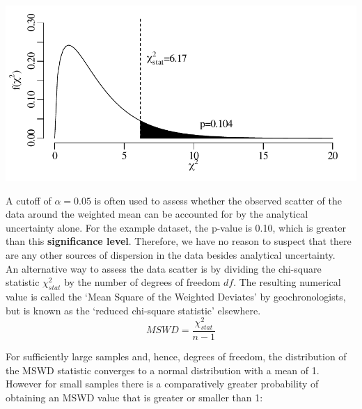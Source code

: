 \begin{refsection}
\noindent\begin{minipage}[t]{.7\textwidth}
\strut\vspace*{-\baselineskip}\newline
\includegraphics[width=\textwidth]{../figures/chi2wtdmean.pdf}
\end{minipage}
\begin{minipage}[t]{.3\textwidth}
  \label{fig:chi2}
\end{minipage}

A cutoff of $\alpha=0.05$ is often used to assess whether the observed
scatter of the data around the weighted mean can be accounted for by
the analytical uncertainty alone.  For the example dataset, the
p-value is 0.10, which is greater than this \textbf{significance
  level}. Therefore, we have no reason to suspect that there are any
other sources of dispersion in the data besides analytical
uncertainty.\\

An alternative way to assess the data scatter is by dividing the
chi-square statistic $\chi^2_{stat}$ by the number of degrees of
freedom $df$.  The resulting numerical value is called the `Mean
Square of the Weighted Deviates' \citep[MSWD,][]{mcintyre1966} by
geochronologists, but is known as the `reduced chi-square statistic'
elsewhere.
\begin{equation}
  MSWD = \frac{\chi^2_{stat}}{n-1}
  \label{eq:mswd}
\end{equation}

For sufficiently large samples and, hence, degrees of
freedom, the distribution of the MSWD statistic converges to a normal
distribution with a mean of 1. However for small samples there is a
comparatively greater probability of obtaining an MSWD value that is
greater or smaller than 1:


\end{refsection}
